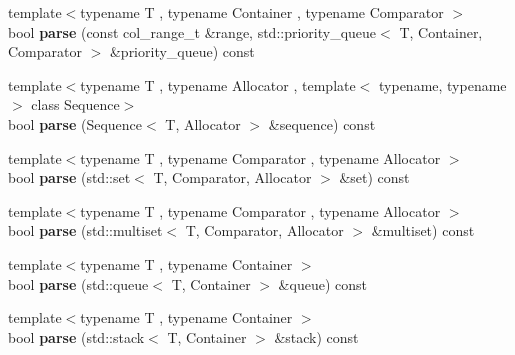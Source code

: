 \begin{DoxyCompactItemize}
\item 
\hypertarget{classstrtk_1_1token__grid_1_1row__type_a9daf80ea9723a4023044261ea48a50a5}{{\footnotesize template$<$typename T , typename Container , typename Comparator $>$ }\\bool {\bfseries parse} (const col\-\_\-range\-\_\-t \&range, std\-::priority\-\_\-queue$<$ T, Container, Comparator $>$ \&priority\-\_\-queue) const }\label{classstrtk_1_1token__grid_1_1row__type_a9daf80ea9723a4023044261ea48a50a5}

\item 
\hypertarget{classstrtk_1_1token__grid_1_1row__type_aeca97f4b9b7c5db1c015983bdf03b7ba}{{\footnotesize template$<$typename T , typename Allocator , template$<$ typename, typename $>$ class Sequence$>$ }\\bool {\bfseries parse} (Sequence$<$ T, Allocator $>$ \&sequence) const }\label{classstrtk_1_1token__grid_1_1row__type_aeca97f4b9b7c5db1c015983bdf03b7ba}

\item 
\hypertarget{classstrtk_1_1token__grid_1_1row__type_aceafe627b6deed238309349628b14d99}{{\footnotesize template$<$typename T , typename Comparator , typename Allocator $>$ }\\bool {\bfseries parse} (std\-::set$<$ T, Comparator, Allocator $>$ \&set) const }\label{classstrtk_1_1token__grid_1_1row__type_aceafe627b6deed238309349628b14d99}

\item 
\hypertarget{classstrtk_1_1token__grid_1_1row__type_acaf676a4ff1aebfcc326d5591f50836d}{{\footnotesize template$<$typename T , typename Comparator , typename Allocator $>$ }\\bool {\bfseries parse} (std\-::multiset$<$ T, Comparator, Allocator $>$ \&multiset) const }\label{classstrtk_1_1token__grid_1_1row__type_acaf676a4ff1aebfcc326d5591f50836d}

\item 
\hypertarget{classstrtk_1_1token__grid_1_1row__type_ac26422f6dc53556026e6a1a95550798f}{{\footnotesize template$<$typename T , typename Container $>$ }\\bool {\bfseries parse} (std\-::queue$<$ T, Container $>$ \&queue) const }\label{classstrtk_1_1token__grid_1_1row__type_ac26422f6dc53556026e6a1a95550798f}

\item 
\hypertarget{classstrtk_1_1token__grid_1_1row__type_a205af4e759e701588dc3462140e82a67}{{\footnotesize template$<$typename T , typename Container $>$ }\\bool {\bfseries parse} (std\-::stack$<$ T, Container $>$ \&stack) const }\label{classstrtk_1_1token__grid_1_1row__type_a205af4e759e701588dc3462140e82a67}


\end{DoxyCompactItemize}
